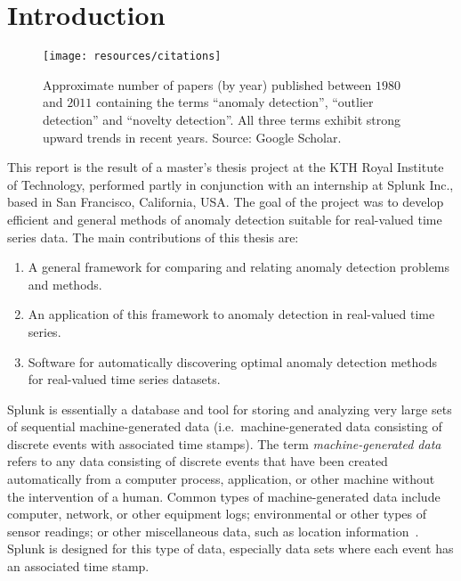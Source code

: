 \chapter{Introduction}

\begin{figure}[htb]
    \vspace{-10pt}
    \begin{center}
        \texttt{[image: resources/citations]}
    \end{center}
    \vspace{-20pt}
    \caption{\small Approximate number of papers (by year) published between $1980$ and $2011$ containing the terms ``anomaly detection'', ``outlier detection'' and ``novelty detection''. All three terms exhibit strong upward trends in recent years. Source: Google Scholar.}
    \vspace{-0pt}
\label{fig:citations}
\end{figure}

This report is the result of a master's thesis project at the KTH Royal Institute of Technology, performed partly in conjunction with an internship at Splunk Inc.\@, based in San Francisco, California, USA\@. The goal of the project was to develop efficient and general methods of anomaly detection suitable for real-valued time series data. The main contributions of this thesis are:
\begin{enumerate}
    \item A general framework for comparing and relating anomaly detection problems and methods.
    \item An application of this framework to anomaly detection in real-valued time series.
    \item Software for automatically discovering optimal anomaly detection methods for real-valued time series datasets.
\end{enumerate}

Splunk is essentially a database and tool for storing and analyzing very large sets of sequential machine-generated data (i.e.\ machine-generated data consisting of discrete events with associated time stamps). The term \emph{machine-generated data} refers to any data consisting of discrete events that have been created automatically from a computer process, application, or other machine without the intervention of a human. Common types of machine-generated data include computer, network, or other equipment logs; environmental or other types of sensor readings; or other miscellaneous data, such as location information~\cite{machine_data}. Splunk is designed for this type of data, especially data sets where each event has an associated time stamp.

